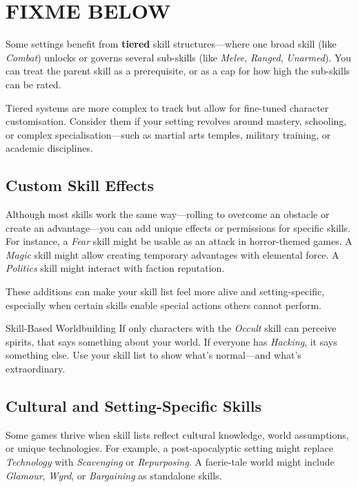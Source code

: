 \section{FIXME BELOW}


Some settings benefit from \textbf{tiered} skill structures—where one broad skill (like \textit{Combat}) unlocks or governs several sub-skills (like \textit{Melee}, \textit{Ranged}, \textit{Unarmed}). You can treat the parent skill as a prerequisite, or as a cap for how high the sub-skills can be rated.

Tiered systems are more complex to track but allow for fine-tuned character customisation. Consider them if your setting revolves around mastery, schooling, or complex specialisation—such as martial arts temples, military training, or academic disciplines.

\subsection{Custom Skill Effects}\label{toolbox:custom-skill-effects}

Although most skills work the same way—rolling to overcome an obstacle or create an advantage—you can add unique effects or permissions for specific skills. For instance, a \textit{Fear} skill might be usable as an attack in horror-themed games. A \textit{Magic} skill might allow creating temporary advantages with elemental force. A \textit{Politics} skill might interact with faction reputation.

These additions can make your skill list feel more alive and setting-specific, especially when certain skills enable special actions others cannot perform.

\begin{CommentBox}{Skill-Based Worldbuilding}
    If only characters with the \textit{Occult} skill can perceive spirits, that says something about your world.  
    If everyone has \textit{Hacking}, it says something else. Use your skill list to show what’s normal—and what’s extraordinary.
\end{CommentBox}

\subsection{Cultural and Setting-Specific Skills}
Some games thrive when skill lists reflect cultural knowledge, world assumptions, or unique technologies. For example, a post-apocalyptic setting might replace \textit{Technology} with \textit{Scavenging} or \textit{Repurposing}. A faerie-tale world might include \textit{Glamour}, \textit{Wyrd}, or \textit{Bargaining} as standalone skills.

